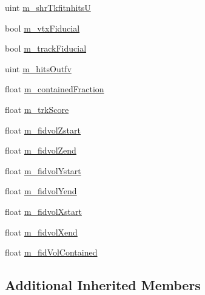\begin{DoxyCompactItemize}
\item 
uint \hyperlink{classselection_1_1CCincSelection_a3617f2e35ecc3cd9ceb53108b4c288cb}{m\-\_\-shr\-Tkfitnhits\-U}
\item 
bool \hyperlink{classselection_1_1CCincSelection_a0f08b768b994a2b2798a54a1b11cfaef}{m\-\_\-vtx\-Fiducial}
\item 
bool \hyperlink{classselection_1_1CCincSelection_a7f2d544a3260377cab6db80b8bf81302}{m\-\_\-track\-Fiducial}
\item 
uint \hyperlink{classselection_1_1CCincSelection_ac839d87e0a429876df355fee2a561e60}{m\-\_\-hits\-Outfv}
\item 
float \hyperlink{classselection_1_1CCincSelection_a5ac3c52c6a88691182c3b3c6594d9744}{m\-\_\-contained\-Fraction}
\item 
float \hyperlink{classselection_1_1CCincSelection_a2c3b80516e3731ec9b4f5ccbee6864ba}{m\-\_\-trk\-Score}
\item 
float \hyperlink{classselection_1_1CCincSelection_a291cc5986c0861bf1883ec1c41457afd}{m\-\_\-fidvol\-Zstart}
\item 
float \hyperlink{classselection_1_1CCincSelection_a2510a29ed7584b2d56eb8dff636ceee6}{m\-\_\-fidvol\-Zend}
\item 
float \hyperlink{classselection_1_1CCincSelection_a28900415eda1eb30d6263081e943e6a5}{m\-\_\-fidvol\-Ystart}
\item 
float \hyperlink{classselection_1_1CCincSelection_a01d6a0608356e4ea245f23e1b6934fd3}{m\-\_\-fidvol\-Yend}
\item 
float \hyperlink{classselection_1_1CCincSelection_aab38faac4866d19339aadbc3ac1eb55b}{m\-\_\-fidvol\-Xstart}
\item 
float \hyperlink{classselection_1_1CCincSelection_ae4bab4cf8ea55e54fcdaa66d2fe44c1d}{m\-\_\-fidvol\-Xend}
\item 
float \hyperlink{classselection_1_1CCincSelection_a3412d86b03a97a65fed3d5d8a41ed2c0}{m\-\_\-fid\-Vol\-Contained}
\end{DoxyCompactItemize}
\subsection*{Additional Inherited Members}


